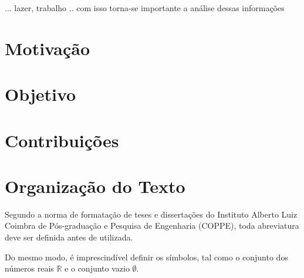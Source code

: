 ... lazer, trabalho
.. com isso torna-se importante a análise dessas informações

\section{Motivação}
\section{Objetivo}
\section{Contribuições}
\section{Organização do Texto}


Segundo a norma de formata{\c c}\~ao de teses e disserta{\c c}\~oes do
Instituto Alberto Luiz Coimbra de P\'os-gradua{\c c}\~ao e Pesquisa de
Engenharia (COPPE), toda abreviatura deve ser definida antes de
utilizada.

Do mesmo modo, \'e imprescind\'ivel definir os s\'imbolos, tal como o
conjunto dos n\'umeros reais $\mathbb{R}$ e o conjunto vazio $\emptyset$.

